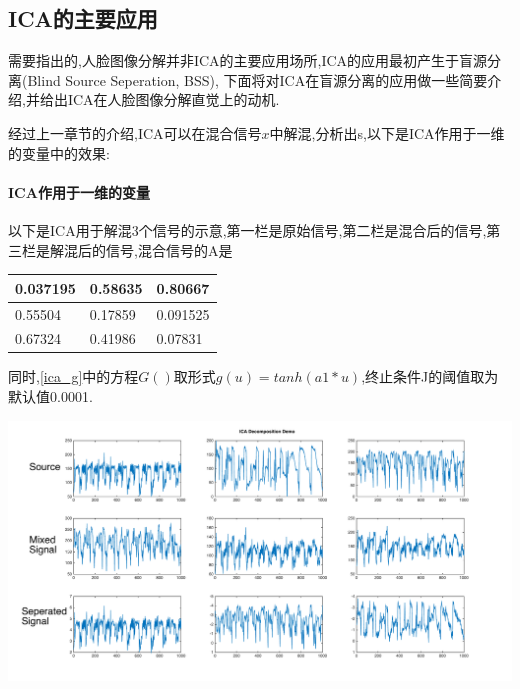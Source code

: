 \subsection{ICA的主要应用}
需要指出的,人脸图像分解并非ICA的主要应用场所,ICA的应用最初产生于盲源分离(Blind Source Seperation, BSS), 下面将对ICA在盲源分离的应用做一些简要介绍,并给出ICA在人脸图像分解直觉上的动机.\newline

经过上一章节的介绍,ICA可以在混合信号$x$中解混,分析出s,以下是ICA作用于一维的变量中的效果:
	\paragraph{ICA作用于一维的变量}	
	以下是ICA用于解混3个信号的示意,第一栏是原始信号,第二栏是混合后的信号,第三栏是解混后的信号,混合信号的A是
	\begin{center}\begin{tabular}{|l|l|l|}
\hline
0.037195&0.58635&0.80667\\\hline
0.55504&0.17859&0.091525\\\hline
0.67324&0.41986&0.07831\\\hline
\end{tabular}
\end{center}

同时,\ref{ica_g}中的方程$G()$取形式$g(u)=tanh(a1*u)$,终止条件J的阈值取为默认值0.0001.

\begin{center}
\begin{minipage}[t]{\linewidth}
\center
{
\includegraphics[width=\textwidth]{Img/ica_decom.pdf} 
\label{fig:icadecom}
}
\end{minipage}
\medskip
\end{center}

